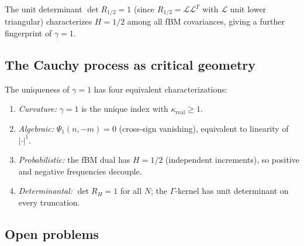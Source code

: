 \documentclass[11pt,a4paper]{article}
\theoremstyle{plain}
\theoremstyle{definition}
\theoremstyle{remark}
\begin{document}
The unit determinant $\det R_{1/2} = 1$ (since $R_{1/2} = \mathcal{L}\mathcal{L}^T$
with $\mathcal{L}$ unit lower triangular) characterizes $H = 1/2$ among
all fBM covariances, giving a further fingerprint of $\gamma = 1$.


\subsection{The Cauchy process as critical geometry}

The uniqueness of $\gamma = 1$ has four equivalent characterizations:
\begin{enumerate}[label=(\alph*)]
\item \emph{Curvature:} $\gamma = 1$ is the unique index with
  $\kappa_{\mathrm{real}} \geq 1$.
\item \emph{Algebraic:} $\Psi_1(n,-m) = 0$ (cross-sign vanishing),
  equivalent to linearity of $|\cdot|^1$.
\item \emph{Probabilistic:} the fBM dual has $H = 1/2$ (independent
  increments), so positive and negative frequencies decouple.
\item \emph{Determinantal:} $\det R_H = 1$ for all $N$; the
  $\Gamma$-kernel has unit determinant on every truncation.
\end{enumerate}


\subsection{Open problems}
\end{document}
